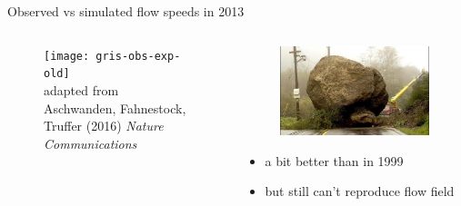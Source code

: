 \documentclass[hide notes,intlimits]{beamer}
\begin{document}
\begin{frame}{Observed vs simulated flow speeds in 2013}
  \begin{columns}[c]
    \begin{column}{.6\linewidth}
    \begin{figure}
      \texttt{[image: gris-obs-exp-old]}
      \\ \tiny{adapted from Aschwanden, Fahnestock, Truffer (2016) \textit{Nature Communications}}
    \end{figure}
    \end{column}
    \begin{column}{.4\linewidth}
      \begin{figure}
        \includegraphics[width=\textwidth]{roadblocks}
      \end{figure}
      \begin{itemize}
      \item a bit better than in 1999
      \item but still can't reproduce flow field
      \end{itemize}
    \end{column}
  \end{columns}
  \note[item]{}
\end{frame}
\end{document}

